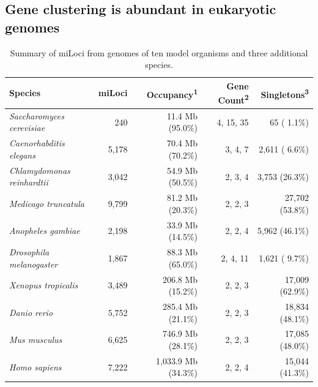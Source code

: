 \subsection{Gene clustering is abundant in eukaryotic genomes}

\begin{table}
\caption{Summary of miLoci from genomes of ten model organisms and three additional species.}
\label{Table:miLocusSummaryModOrg}
\begin{tabularx}{\textwidth}{lrrrr}
\hline
                            Species &               miLoci & Occupancy\textsuperscript{1} & Gene Count\textsuperscript{2} & Singletons\textsuperscript{3}  \\ \hline
\textit{Saccharomyces cerevisiae}   &                  240 &             11.4 Mb (95.0\%) &                     4, 15, 35 &                   65 ( 1.1\%)  \\
\textit{Caenorhabditis elegans}     &                5,178 &             70.4 Mb (70.2\%) &                       3, 4, 7 &                2,611 ( 6.6\%)  \\
\textit{Chlamydomonas reinhardtii}  &                3,042 &             54.9 Mb (50.5\%) &                       2, 3, 4 &                3,753 (26.3\%)  \\
\textit{Medicago truncatula}        &                9,799 &             81.2 Mb (20.3\%) &                       2, 2, 3 &               27,702 (53.8\%)  \\
\textit{Anopheles gambiae}          &                2,198 &             33.9 Mb (14.5\%) &                       2, 2, 4 &                5,962 (46.1\%)  \\
\textit{Drosophila melanogaster}    &                1,867 &             88.3 Mb (65.0\%) &                      2, 4, 11 &                1,621 ( 9.7\%)  \\
\textit{Xenopus tropicalis}         &                3,489 &            206.8 Mb (15.2\%) &                       2, 2, 3 &               17,009 (62.9\%)  \\
\textit{Danio rerio}                &                5,752 &            285.4 Mb (21.1\%) &                       2, 2, 3 &               18,834 (48.1\%)  \\
\textit{Mus musculus}               &                6,625 &            746.9 Mb (28.1\%) &                       2, 2, 3 &               17,085 (48.0\%)  \\
\textit{Homo sapiens}               &                7,222 &          1,033.9 Mb (34.3\%) &                       2, 2, 4 &               15,044 (41.3\%)  \\ \hline

\end{tabularx}
\end{table}

